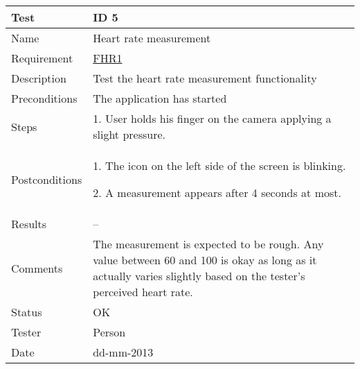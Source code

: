 \begin{table}
\begin{center}
\begin{tabular}{ | l | p{10cm} | }
	\hline
	\textbf{Test}	&	\textbf{ID 5} \\
	\hline\noalign{\smallskip}\noalign{\smallskip}\hline
	Name				& Heart rate measurement \\
	Requirement			& \hyperref[table:reqheartrate]{FHR1} \\
	Description			& Test the heart rate measurement functionality \\
	Preconditions		& The application has started \\
	Steps 				&	\par 1. User holds his finger on the camera applying a slight pressure. \\
	Postconditions		&	\par 1. The icon on the left side of the screen is blinking.
							\par 2. A measurement appears after 4 seconds at most.\\
	Results				& -- \\
	Comments			&	The measurement is expected to be rough.
							Any value between 60 and 100 is okay as long as it actually varies slightly based
							on the tester's perceived heart rate.  \\
	Status				& OK \\
	Tester				& Person \\
	Date				& dd-mm-2013 \\
	\hline
\end{tabular}
\end{center}
\end{table}